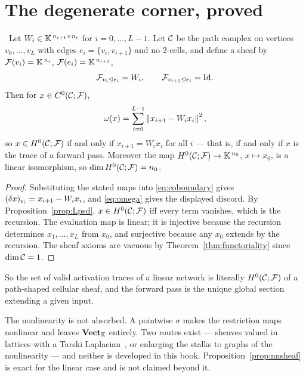 \section{The degenerate corner, proved}

\begin{proposition}
\label{prop:nnsheaf}
\Proved\ Let $W_i\in\mathbb{K}^{\,n_{i+1}\times n_i}$ for $i=0,\dots,L-1$. Let
$\mathcal{C}$ be the path complex on vertices $v_0,\dots,v_L$ with edges
$e_i=\{v_i,v_{i+1}\}$ and no $2$-cells, and define a sheaf by
$\mathcal{F}(v_i)=\mathbb{K}^{\,n_i}$, $\mathcal{F}(e_i)=\mathbb{K}^{\,n_{i+1}}$,
\[
  \mathcal{F}_{v_i\trianglelefteq e_i}=W_i,\qquad \mathcal{F}_{v_{i+1}\trianglelefteq e_i}=\mathrm{Id} .
\]
Then for $x\in C^{0}(\mathcal{C};\mathcal{F})$,
\[
  \omega(x)=\sum_{i=0}^{L-1}\left\lVert x_{i+1}-W_ix_i \right\rVert^2,
\]
so $x\in H^{0}(\mathcal{C};\mathcal{F})$ if and only if $x_{i+1}=W_ix_i$ for all $i$ --- that is, if
and only if $x$ is the trace of a forward pass. Moreover the map
$H^{0}(\mathcal{C};\mathcal{F})\to\mathbb{K}^{\,n_0}$, $x\mapsto x_0$, is a linear isomorphism, so
$\dim H^{0}(\mathcal{C};\mathcal{F})=n_0$.
\end{proposition}
\begin{proof}
Substituting the stated maps into \eqref{eq:coboundary} gives
$(\delta x)_{e_i}=x_{i+1}-W_ix_i$, and \eqref{eq:omega} gives the displayed
discord. By Proposition~\ref{prop:Lpsd}, $x\in H^{0}(\mathcal{C};\mathcal{F})$ iff every term
vanishes, which is the recursion. The evaluation map is linear; it is
injective because the recursion determines $x_1,\dots,x_L$ from $x_0$, and
surjective because any $x_0$ extends by the recursion. The sheaf axioms are
vacuous by Theorem~\ref{thm:functoriality} since $\dim\mathcal{C}=1$.
\end{proof}

So the set of valid activation traces of a linear network is literally
$H^{0}(\mathcal{C};\mathcal{F})$ of a path-shaped cellular sheaf, and the forward pass is the unique
global section extending a given input.

\begin{hon}\Hon
The nonlinearity is not absorbed. A pointwise $\sigma$ makes the restriction
maps nonlinear and leaves $\mathbf{Vect}_{\mathbb{K}}$ entirely. Two routes exist ---
sheaves valued in lattices with a Tarski Laplacian~\cite{GhristRiess}, or
enlarging the stalks to graphs of the nonlinearity --- and neither is
developed in this book. Proposition~\ref{prop:nnsheaf} is exact for the linear
case and is not claimed beyond it.
\end{hon}

